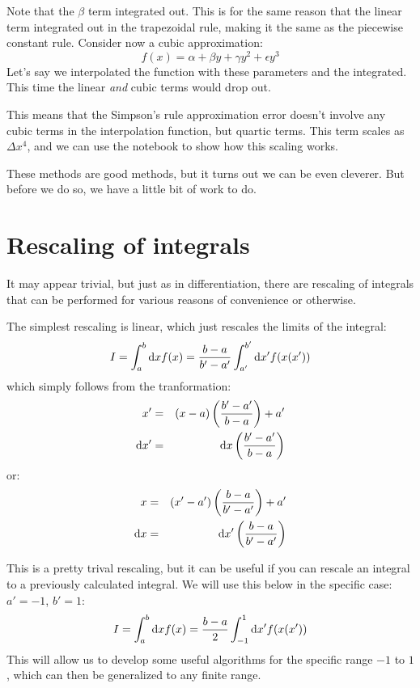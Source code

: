 Note that the $\beta$ term integrated out. This is for the same reason
that the linear term integrated out in the trapezoidal rule, making it
the same as the piecewise constant rule. Consider now a cubic
approximation:
\begin{equation}
  f(x) = \alpha + \beta y + \gamma y^2 + \epsilon y^3
\end{equation}
Let's say we interpolated the function with these parameters and the
integrated. This time the linear {\it and} cubic terms would drop out.

This means that the Simpson's rule approximation error doesn't involve
any cubic terms in the interpolation function, but quartic terms. This
term scales as $\Delta x^4$, and we can use the notebook to show how
this scaling works.

These methods are good methods, but it turns out we can be even
cleverer. But before we do so, we have a little bit of work to do.

\section{Rescaling of integrals}

It may appear trivial, but just as in differentiation, there are
rescaling of integrals that can be performed for various reasons of
convenience or otherwise. 

The simplest rescaling is linear, which just rescales the limits of
the integral:
\begin{equation}
 I = \int_a^b {\rm d}x f(x) = \frac{b-a}{b'-a'} \int_{a'}^{b'} {\rm d}x' f(x(x'))
\end{equation}
which simply follows from the tranformation:
\begin{eqnarray}
x' &=& (x-a) \left(\frac{b' - a'}{b-a}\right) + a' \cr
{\rm d}x' &=& {\rm d}x \left(\frac{b' - a'}{b-a}\right)
\end{eqnarray}
or:
\begin{eqnarray}
x &=& (x'-a') \left(\frac{b - a}{b'-a'}\right) + a' \cr
{\rm d}x &=& {\rm d}x' \left(\frac{b - a}{b'-a'}\right)
\end{eqnarray}

This is a pretty trival rescaling, but it can be useful if you can
rescale an integral to a previously calculated integral. We will use
this below in the specific case: $a'=-1$, $b'=1$:
\begin{equation}
 I = \int_a^b {\rm d}x f(x) = \frac{b-a}{2} \int_{-1}^{1} {\rm d}x' f(x(x'))
\end{equation}
This will allow us to develop some useful algorithms for the specific
range $-1$ to $1$, which can then be generalized to any finite range.

